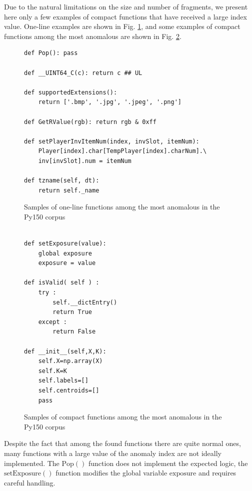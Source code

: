 \documentclass[10pt,conference]{IEEEtran}
\begin{document}
Due to the natural limitations on the size and number of fragments,
 we present here only a few examples of compact functions that have received a large index value.
One-line examples are shown in Fig. \ref{oneline},
 and some examples of compact functions among the most anomalous are shown in Fig. \ref{compact}.

\begin{figure}[H]
\caption{Samples of one-line functions among the most anomalous in the Py150 corpus}
\label{oneline}
\begin{verbatim}
def Pop(): pass

def __UINT64_C(c): return c ## UL

def supportedExtensions():
    return ['.bmp', '.jpg', '.jpeg', '.png']

def GetRValue(rgb): return rgb & 0xff

def setPlayerInvItemNum(index, invSlot, itemNum):
    Player[index].char[TempPlayer[index].charNum].\
    inv[invSlot].num = itemNum

def tzname(self, dt):                                                                                                                                     
    return self._name
\end{verbatim}
\end{figure}

\begin{figure}%
\caption{Samples of compact functions among the most anomalous in the Py150 corpus}
\label{compact}
\begin{verbatim}

def setExposure(value):
    global exposure
    exposure = value

def isValid( self ) :
    try :
        self.__dictEntry()
        return True
    except :
        return False

def __init__(self,X,K):
    self.X=np.array(X)
    self.K=K
    self.labels=[]
    self.centroids=[]
    pass
\end{verbatim}
\end{figure}

Despite the fact that among the found functions there are quite normal ones,
 many functions with a large value of the anomaly index are not ideally implemented.
The $\mathrm{Pop()}$ function does not implement the expected logic,
the $\mathrm{setExposure()}$ function modifies the global variable $\mathrm{exposure}$
 and requires careful handling.
\end{document}
